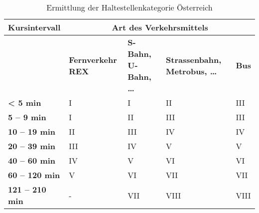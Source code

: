 \begin{table}[ht]
    \begin{tabular}[c]{l p{2.9cm} p{2.8cm} p{2.8cm} p{2.8cm}}
        \toprule
        \textbf{Kursintervall}
                                & \multicolumn{4}{c}{\textbf{Art des Verkehrsmittels}}\\
        \midrule
        \textbf{}
                                & \textbf{Fernverkehr REX}
                                & \textbf{S-Bahn, U-Bahn, \dots}
                                & \textbf{Strassenbahn, Metrobus, \dots}
                                & \textbf{Bus}\\
        \textbf{< 5 min}
                                & I
                                & I
                                & II
                                & \cellcolor{red!25}III\\
        \textbf{5 -- 9 min}
                                & I
                                & II
                                & III
                                & III\\
        \textbf{10 -- 19 min}
                                & II
                                & III
                                & IV
                                & IV\\
        \textbf{20 -- 39 min}
                                & III
                                & IV
                                & \cellcolor{red!25}V
                                & V\\
        \textbf{40 -- 60 min}
                                & \cellcolor{red!25}IV
                                & V
                                & \cellcolor{red!25}VI
                                & VI\\
        \cellcolor{red!25}\textbf{60 -- 120 min}
                                & \cellcolor{red!25}V
                                & \cellcolor{red!25}VI
                                & \cellcolor{red!25}VII
                                & \cellcolor{red!25}VII\\
        \cellcolor{red!25}\textbf{121 -- 210 min}
                                & -
                                & \cellcolor{red!25}VII
                                & \cellcolor{red!25}VIII
                                & \cellcolor{red!25}VIII\\
        \bottomrule
    \end{tabular}
    \caption{Ermittlung der Haltestellenkategorie Österreich}
    \label{table:Ermittlung der Haltestellenkategorie Österreich}
\end{table}

